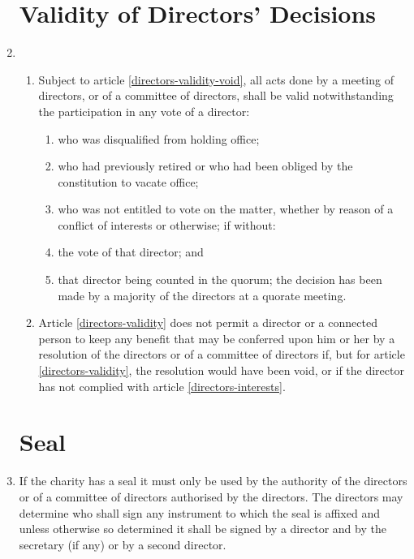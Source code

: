 \begin{enumerate}
\section{Validity of Directors' Decisions}

\item
  \begin{enumerate}
  \item \label{directors-validity}
    Subject to article \ref{directors-validity-void}, all acts done by a meeting of directors,
    or of a committee of directors, shall be valid notwithstanding the
    participation in any vote of a director:
    \begin{enumerate}
    \item
      who was disqualified from holding office;
    \item
      who had previously retired or who had been obliged by the
      constitution to vacate office;
    \item
      who was not entitled to vote on the matter, whether by reason of a
      conflict of interests or otherwise; if without:
    \item
      the vote of that director; and
    \item
      that director being counted in the quorum; the decision has been
      made by a majority of the directors at a quorate meeting.
    \end{enumerate}
  \item \label{directors-validity-void}
    Article \ref{directors-validity} does not permit a director or a connected person to
    keep any benefit that may be conferred upon him or her by a
    resolution of the directors or of a committee of directors if, but
    for article \ref{directors-validity}, the resolution would have been void, or if the
    director has not complied with article \ref{directors-interests}.
  \end{enumerate}

\section{Seal}

\item
  If the charity has a seal it must only be used by the authority of
  the directors or of a committee of directors authorised by the
  directors. The directors may determine who shall sign any
  instrument to which the seal is affixed and unless otherwise so
  determined it shall be signed by a director and by the secretary
  (if any) or by a second director.


\end{enumerate}

